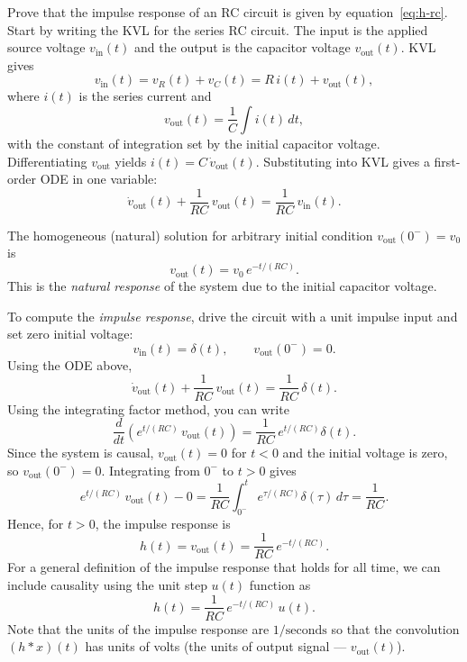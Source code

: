 \begin{popquiz}
Prove that the impulse response of an RC circuit is given by equation~\eqref{eq:h-rc}.
\popqsplit
Start by writing the KVL for the series RC circuit. The input is the applied source voltage $v_{\text{in}}(t)$ and the output is the capacitor voltage $v_{\text{out}}(t)$. KVL gives
\[
v_{\text{in}}(t)=v_R(t)+v_C(t)=R\,i(t)+v_{\text{out}}(t),
\]
where $i(t)$ is the series current and
\[
v_{\text{out}}(t)=\frac{1}{C}\int i(t)\,dt,
\]
with the constant of integration set by the initial capacitor voltage. Differentiating $v_{\text{out}}$ yields $i(t)=C\,\dot v_{\text{out}}(t)$. Substituting into KVL gives a first-order ODE in one variable:
\[
\dot v_{\text{out}}(t)+\frac{1}{RC}\,v_{\text{out}}(t)=\frac{1}{RC}\,v_{\text{in}}(t).
\]

The homogeneous (natural) solution for arbitrary initial condition $v_{\text{out}}(0^-)=v_0$ is
\[
v_{\text{out}}(t)=v_0\,e^{-t/(RC)}.
\]
This is the \emph{natural response} of the system due to the initial capacitor voltage.

To compute the \emph{impulse response}, drive the circuit with a unit impulse input and set zero initial voltage:
\[
v_{\text{in}}(t)=\delta(t),\qquad v_{\text{out}}(0^-)=0.
\]
Using the ODE above,
\[
\dot v_{\text{out}}(t)+\frac{1}{RC}\,v_{\text{out}}(t)=\frac{1}{RC}\,\delta(t).
\]
Using the integrating factor method, you can write 
\[
\frac{d}{dt}\!\left(e^{t/(RC)}\,v_{\text{out}}(t)\right)=\frac{1}{RC}\,e^{t/(RC)}\delta(t).
\]
Since the system is causal, $v_{\text{out}}(t)=0$ for $t<0$ and the initial voltage is zero, so $v_{\text{out}}(0^-)=0$. Integrating from $0^-$ to $t>0$ gives
\[
e^{t/(RC)}\,v_{\text{out}}(t)-0=\frac{1}{RC}\!\int_{0^-}^{t}\!e^{\tau/(RC)}\delta(\tau)\,d\tau
=\frac{1}{RC}.
\]
Hence, for $t > 0$, the impulse response is 
\[
h(t) = v_{\text{out}}(t)=\frac{1}{RC}\,e^{-t/(RC)}.
\]
For a general definition of the impulse response that holds for all time, we can include causality using the unit step $u(t)$ function as
\[
h(t)=\frac{1}{RC}\,e^{-t/(RC)}\,u(t).
\]
Note that the units of the impulse response are $1/\text{seconds}$ so that the convolution $(h*x)(t)$ has units of volts (the units of output signal --- $v_{\text{out}}(t)$).

\end{popquiz}

